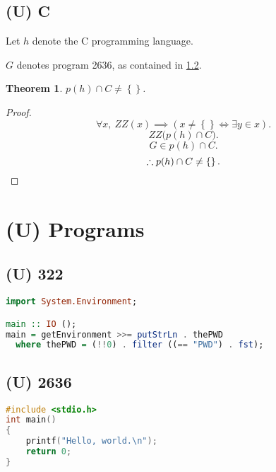 \documentclass{article}
\newtheorem{thm}{Theorem}
\begin{document}
		\subsection{(U) C}
			Let $h$ denote the C programming language.

			$G$ denotes program 2636, as contained in \cref{subsection:p2636}.
			\begin{thm}
				$p(h) \cap C \neq \left\{\right\}$.
			\end{thm}
			\begin{proof}
				\[
					\forall x,\ 
					\mathit{ZZ}(x) \implies 
					\left(x \neq \left\{\right\} \iff \exists y \in x\right).
				\]
				\[
					\mathit{ZZ}\big(p(h) \cap C\big).
				\]
				\[
					G \in p(h) \cap C.
				\]
				\[
					\therefore p(h) \cap C \neq \left\{\right\}.\qedhere
				\]
			\end{proof}
	\section{(U) Programs}
		\subsection{(U) 322}\label{subsection:p322}
			\begin{lstlisting}[language=Haskell]
import System.Environment;

main :: IO ();
main = getEnvironment >>= putStrLn . thePWD
  where thePWD = (!!0) . filter ((== "PWD") . fst);
			\end{lstlisting}
		\subsection{(U) 2636}\label{subsection:p2636}
			\begin{lstlisting}[language=C]
#include <stdio.h>
int main()
{
	printf("Hello, world.\n");
	return 0;
}
			\end{lstlisting}
\end{document}
